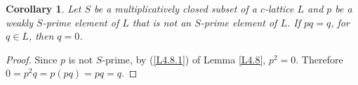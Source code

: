\documentclass[10pt,twoside,a4paper]{amsart}
\numberwithin{equation}{section}
\theoremstyle{plain}
\newtheorem{cor}[lem]{Corollary}
\theoremstyle{definition}
\begin{document}

\begin{cor}%
	Let $S$ be a multiplicatively closed subset of a $c$-lattice $L$ and $p$ be a weakly $S$-prime element of $L$ that is not an $S$-prime element of $L$. If $pq=q$, for $q\in L$, then $q=0$.
\end{cor}
\begin{proof}
	Since $p$ is not  $S$-prime, by (\ref{L4.8.1}) of Lemma \ref{L4.8}, $p^2=0$. Therefore $0=p^2q=p(pq)=pq=q$.
\end{proof}
\end{document}
